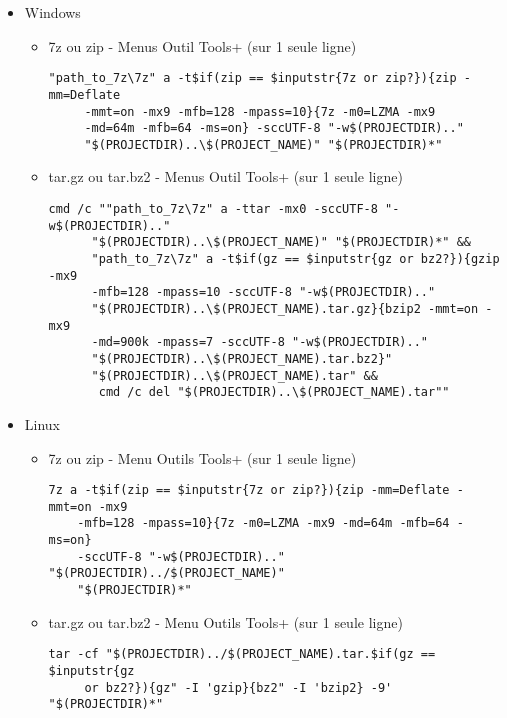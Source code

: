 
\begin{itemize}
\item Windows
\begin{itemize}
\item 7z ou zip - Menus Outil Tools+ (sur 1 seule ligne)
\begin{verbatim}
"path_to_7z\7z" a -t$if(zip == $inputstr{7z or zip?}){zip -mm=Deflate
     -mmt=on -mx9 -mfb=128 -mpass=10}{7z -m0=LZMA -mx9 
     -md=64m -mfb=64 -ms=on} -sccUTF-8 "-w$(PROJECTDIR).."
     "$(PROJECTDIR)..\$(PROJECT_NAME)" "$(PROJECTDIR)*"
\end{verbatim}

\item tar.gz ou tar.bz2 - Menus Outil Tools+  (sur 1 seule ligne)
\begin{verbatim}
cmd /c ""path_to_7z\7z" a -ttar -mx0 -sccUTF-8 "-w$(PROJECTDIR).."
      "$(PROJECTDIR)..\$(PROJECT_NAME)" "$(PROJECTDIR)*" && 
      "path_to_7z\7z" a -t$if(gz == $inputstr{gz or bz2?}){gzip -mx9 
      -mfb=128 -mpass=10 -sccUTF-8 "-w$(PROJECTDIR).." 
      "$(PROJECTDIR)..\$(PROJECT_NAME).tar.gz}{bzip2 -mmt=on -mx9 
      -md=900k -mpass=7 -sccUTF-8 "-w$(PROJECTDIR).." 
      "$(PROJECTDIR)..\$(PROJECT_NAME).tar.bz2}"
      "$(PROJECTDIR)..\$(PROJECT_NAME).tar" && 
       cmd /c del "$(PROJECTDIR)..\$(PROJECT_NAME).tar""
\end{verbatim}


\end{itemize}

\item Linux
\begin{itemize}
\item 7z ou zip - Menu Outils Tools+ (sur 1 seule ligne)
\begin{verbatim}
7z a -t$if(zip == $inputstr{7z or zip?}){zip -mm=Deflate -mmt=on -mx9
    -mfb=128 -mpass=10}{7z -m0=LZMA -mx9 -md=64m -mfb=64 -ms=on}
    -sccUTF-8 "-w$(PROJECTDIR).." "$(PROJECTDIR)../$(PROJECT_NAME)"
    "$(PROJECTDIR)*"
\end{verbatim}
\item tar.gz ou tar.bz2 - Menu Outils Tools+ (sur 1 seule ligne)
\begin{verbatim}
tar -cf "$(PROJECTDIR)../$(PROJECT_NAME).tar.$if(gz == $inputstr{gz 
     or bz2?}){gz" -I 'gzip}{bz2" -I 'bzip2} -9' "$(PROJECTDIR)*"
\end{verbatim}
\end{itemize}
\end{itemize}
